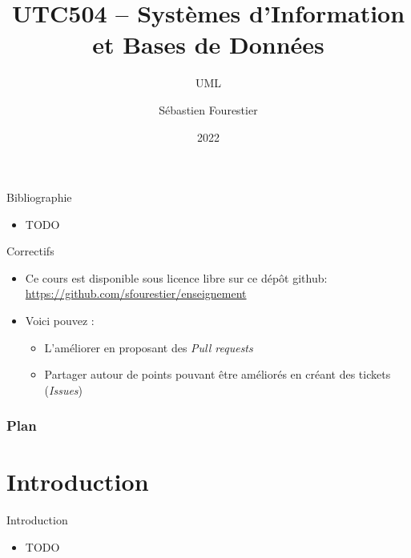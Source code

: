 \documentclass[14pt]{beamer}
\title{UTC504 -- Systèmes d'Information et Bases de Données}
\subtitle{UML}
\author{Sébastien Fourestier}
\date{2022}
\begin{document}
\frame{\titlepage}

\begin{framentitle}{Bibliographie}
    \begin{itemize}
        \item TODO
    \end{itemize}
\end{framentitle}

\begin{framentitle}{Correctifs}
    \begin{itemize}
        \item Ce cours est disponible sous licence libre sur ce dépôt github:\\
            \small{\url{https://github.com/sfourestier/enseignement}}
        \item[\ra] Voici pouvez :
            \begin{itemize}
                \item L'améliorer en proposant des \emph{Pull requests}
                \item Partager autour de points pouvant être améliorés en créant des
                    tickets (\emph{Issues})
            \end{itemize}
    \end{itemize}
\end{framentitle}

\begin{frame}
    \frametitle{Plan}
    \tableofcontents
\end{frame}


\section{Introduction}

\begin{framentitle}{Introduction}
    \begin{itemize}
        \item TODO
    \end{itemize}
\end{framentitle}
\end{document}
